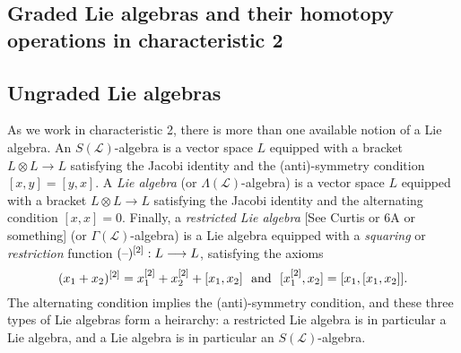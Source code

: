 \documentclass[11pt]{amsart}
\theoremstyle{plain}
\theoremstyle{definition}
\newcommand{\DASH}{\textup{--}}
\renewcommand{\to}{\longrightarrow}
\newcommand{\scrL}{\mathscr{L}}
\theoremstyle{plain}
\newcommand{\LieOperad}{{\scrL}}
\newcommand{\restn}[1]{#1^{[2]}}
\begin{document}
\begin{Lie algebras in characteristic 2 and their homotopy operations}

\section{Graded Lie algebras and their homotopy operations in characteristic 2}\label{sec on Lie algs and homotopy ops}
\subsection{Ungraded Lie algebras}
As we work in characteristic 2, there is more than one available notion of a Lie algebra. An $S(\LieOperad)$-algebra is a vector space $L$ equipped with a bracket $L\otimes L\to L$ satisfying the Jacobi identity and the (anti)-symmetry condition $[x,y]=[y,x]$. A \emph{Lie algebra} (or $\Lambda(\LieOperad)$-algebra) is a vector space $L$ equipped with a bracket $L\otimes L\to L$ satisfying the Jacobi identity and the alternating condition $[x,x]=0$. Finally, a \emph{restricted Lie algebra} [See Curtis or 6A or something] (or $\Gamma(\LieOperad)$-algebra) is a Lie algebra equipped with a \emph{squaring} or \emph{restriction} function $\restn{(\DASH)}:L\to L$, satisfying the axioms
\[\restn{(x_1+x_2)}=\restn{x_1}+\restn{x_2}+[x_1,x_2]\textup{ \ and \ }[\restn{x_1},x_2]=[x_1,[x_1,x_2]].\]
The alternating condition implies the (anti)-symmetry condition, and these three types of Lie algebras form a heirarchy: a restricted Lie algebra is in particular a Lie algebra, and a Lie algebra is in particular an $S(\LieOperad)$-algebra.


\end{Lie algebras in characteristic 2 and their homotopy operations}
\end{document}
